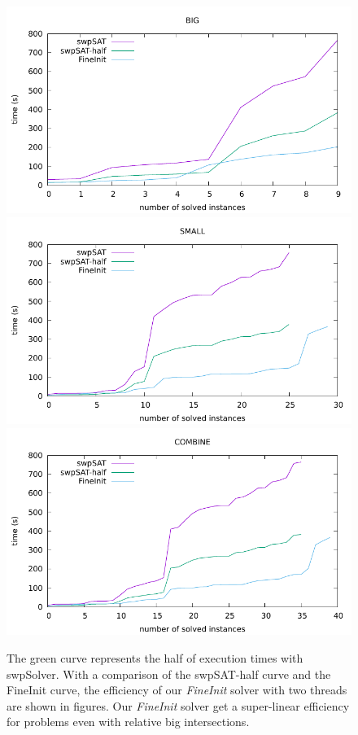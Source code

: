 \documentclass[12pt,a4paper,twoside]{scrartcl}
\numberwithin{equation}{section}
\begin{document}
 \begin{figure}[H]
\begin{center}
  \includegraphics[scale = 1]{DATA/BIG/a4.pdf}
    \includegraphics[scale = 1]{DATA/SMALL/a4.pdf}
    \includegraphics[scale = 1]{DATA/COMBINE/a4.pdf}
  \end{center}
  \caption{The green curve represents the half of execution times with swpSolver. With a comparison of the swpSAT-half curve and the FineInit curve, the efficiency of our \emph{FineInit} solver with two threads are shown in figures. Our \emph{FineInit} solver get a super-linear efficiency for problems even with relative big intersections.}
  \label{Experiment 6 COMBINE}
  \end{figure} 
\clearpage
\end{document}
